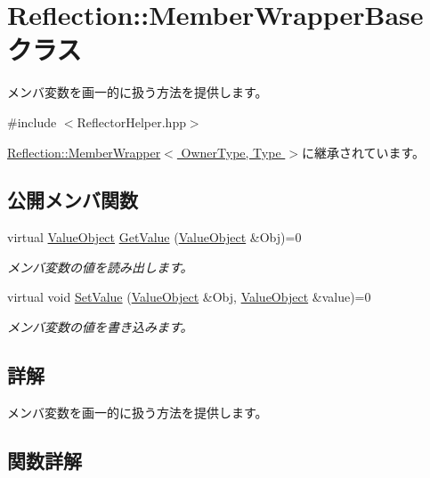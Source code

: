 \hypertarget{class_reflection_1_1_member_wrapper_base}{}\section{Reflection\+:\+:Member\+Wrapper\+Base クラス}
\label{class_reflection_1_1_member_wrapper_base}


メンバ変数を画一的に扱う方法を提供します。 




{\ttfamily \#include $<$Reflector\+Helper.\+hpp$>$}



\hyperlink{class_reflection_1_1_member_wrapper}{Reflection\+::\+Member\+Wrapper$<$ Owner\+Type, Type $>$}に継承されています。

\subsection*{公開メンバ関数}
\begin{DoxyCompactItemize}
\item 
virtual \hyperlink{class_reflection_1_1_value_object}{Value\+Object} \hyperlink{class_reflection_1_1_member_wrapper_base_adf41be4011254910a07a23af427e94b0}{Get\+Value} (\hyperlink{class_reflection_1_1_value_object}{Value\+Object} \&Obj)=0
\begin{DoxyCompactList}\small\item\em メンバ変数の値を読み出します。\end{DoxyCompactList}\item 
virtual void \hyperlink{class_reflection_1_1_member_wrapper_base_ac85dcf08d50b726f633df60ec42a53bb}{Set\+Value} (\hyperlink{class_reflection_1_1_value_object}{Value\+Object} \&Obj, \hyperlink{class_reflection_1_1_value_object}{Value\+Object} \&value)=0
\begin{DoxyCompactList}\small\item\em メンバ変数の値を書き込みます。\end{DoxyCompactList}\end{DoxyCompactItemize}


\subsection{詳解}
メンバ変数を画一的に扱う方法を提供します。



\subsection{関数詳解}
